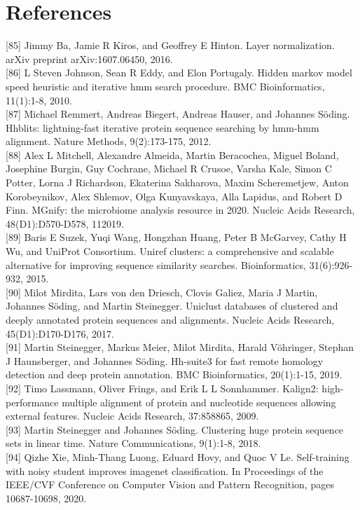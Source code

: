 \documentclass[10pt]{article}
\begin{document}
\section*{References}
[85] Jimmy Ba, Jamie R Kiros, and Geoffrey E Hinton. Layer normalization. arXiv preprint arXiv:1607.06450, 2016.\\[0pt]
[86] L Steven Johnson, Sean R Eddy, and Elon Portugaly. Hidden markov model speed heuristic and iterative hmm search procedure. BMC Bioinformatics, 11(1):1-8, 2010.\\[0pt]
[87] Michael Remmert, Andreas Biegert, Andreas Hauser, and Johannes Söding. Hhblits: lightning-fast iterative protein sequence searching by hmm-hmm alignment. Nature Methods, 9(2):173-175, 2012.\\[0pt]
[88] Alex L Mitchell, Alexandre Almeida, Martin Beracochea, Miguel Boland, Josephine Burgin, Guy Cochrane, Michael R Crusoe, Varsha Kale, Simon C Potter, Lorna J Richardson, Ekaterina Sakharova, Maxim Scheremetjew, Anton Korobeynikov, Alex Shlemov, Olga Kunyavskaya, Alla Lapidus, and Robert D Finn. MGnify: the microbiome analysis resource in 2020. Nucleic Acids Research, 48(D1):D570-D578, 112019.\\[0pt]
[89] Baris E Suzek, Yuqi Wang, Hongzhan Huang, Peter B McGarvey, Cathy H Wu, and UniProt Consortium. Uniref clusters: a comprehensive and scalable alternative for improving sequence similarity searches. Bioinformatics, 31(6):926-932, 2015.\\[0pt]
[90] Milot Mirdita, Lars von den Driesch, Clovis Galiez, Maria J Martin, Johannes Söding, and Martin Steinegger. Uniclust databases of clustered and deeply annotated protein sequences and alignments. Nucleic Acids Research, 45(D1):D170-D176, 2017.\\[0pt]
[91] Martin Steinegger, Markus Meier, Milot Mirdita, Harald Vöhringer, Stephan J Haunsberger, and Johannes Söding. Hh-suite3 for fast remote homology detection and deep protein annotation. BMC Bioinformatics, 20(1):1-15, 2019.\\[0pt]
[92] Timo Lassmann, Oliver Frings, and Erik L L Sonnhammer. Kalign2: high-performance multiple alignment of protein and nucleotide sequences allowing external features. Nucleic Acids Research, 37:858865, 2009.\\[0pt]
[93] Martin Steinegger and Johannes Söding. Clustering huge protein sequence sets in linear time. Nature Communications, 9(1):1-8, 2018.\\[0pt]
[94] Qizhe Xie, Minh-Thang Luong, Eduard Hovy, and Quoc V Le. Self-training with noisy student improves imagenet classification. In Proceedings of the IEEE/CVF Conference on Computer Vision and Pattern Recognition, pages 10687-10698, 2020.\\[0pt]
\end{document}
